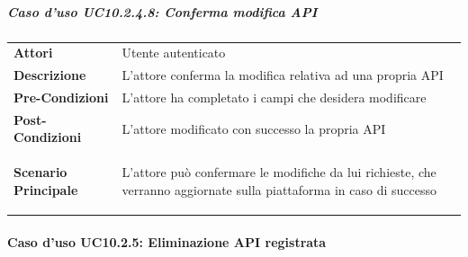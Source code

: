 \subparagraph{Caso d'uso UC10.2.4.8: Conferma modifica API}
\label{UC10_2_4_8}

\begin{minipage}{\linewidth}
	\begin{tabular}{ l | p{11cm}}
		\hline
		\rowcolor{Gray}
		\multicolumn{2}{c}{UC10.2.4.8 - Conferma modifica API} \\
		\hline
		\textbf{Attori} & Utente autenticato \\
		\textbf{Descrizione} & L'attore conferma la modifica relativa ad una propria API\\
		\textbf{Pre-Condizioni} & L'attore ha completato i campi che desidera modificare\\
		\textbf{Post-Condizioni} & L'attore modificato con successo la propria API \\
		\textbf{Scenario Principale} & 
		\begin{enumerate*}[label=(\arabic*.),itemjoin={\newline}]
			\item L'attore può confermare le modifiche da lui richieste, che verranno aggiornate sulla piattaforma in caso di successo
		\end{enumerate*}\\
	\end{tabular}
\end{minipage}

\paragraph{Caso d'uso UC10.2.5: Eliminazione API registrata}
\label{UC10_2_5}


